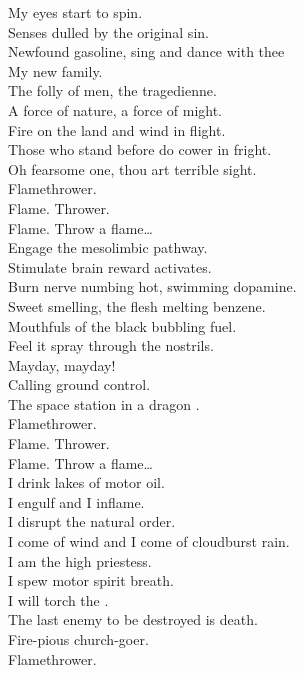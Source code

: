 My eyes start to spin. \\
Senses dulled by the original sin. \\
Newfound gasoline, sing and dance with thee \\
My new family. \\
The folly of men, the tragedienne. \\
A force of nature, a force of might. \\
Fire on the land and wind in flight. \\
Those who stand before do cower in fright. \\
Oh fearsome one, thou art terrible sight. \\

Flamethrower. \\
Flame. Thrower. \\
Flame. Throw a flame… \\

Engage the mesolimbic pathway. \\
Stimulate brain reward activates. \\
Burn nerve numbing hot, swimming dopamine. \\
Sweet smelling, the flesh melting benzene. \\
Mouthfuls of the black bubbling fuel. \\
Feel it spray through the  nostrils. \\
Mayday, mayday! \\
Calling ground control. \\
The space station in a dragon . \\

Flamethrower. \\
Flame. Thrower. \\
Flame. Throw a flame… \\

I drink lakes of motor oil. \\
I engulf and I inflame. \\
I disrupt the natural order. \\
I come of wind and I come of cloudburst rain. \\
I am the high priestess. \\
I spew motor spirit breath. \\
I will torch the . \\
The last enemy to be destroyed is death. \\
Fire-pious church-goer. \\
Flamethrower. \\

